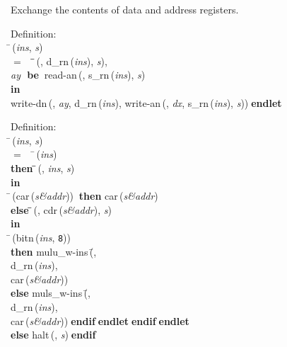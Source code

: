  Exchange the contents of data and address registers.
\begin{tabbing}{\sc Definition}: \\  
\=\,({\it{ins\/}}, {\it{s\/}}) \\ 
$=$$\;\;\;\;$\=\=\,({}, {\rm{d\_rn}}\,({\it{ins\/}}), {\it{s\/}}), \\ 
{\it{ay\/}}{\bf $\;$ be$\;\;$}{\rm{read-an}}\,({}, {\rm{s\_rn}}\,({\it{ins\/}}), {\it{s\/}})\- \\ 
{\bf in} \\ 
{\rm{write-dn}}\,({}, {\it{ay\/}}, {\rm{d\_rn}}\,({\it{ins\/}}), {\rm{write-an}}\,({}, {\it{dx\/}}, {\rm{s\_rn}}\,({\it{ins\/}}), {\it{s\/}}))$\;${\bf  endlet}\-\-
\end{tabbing}

\begin{tabbing}{\sc Definition}: \\  
\=\,({\it{ins\/}}, {\it{s\/}}) \\ 
$=$$\;\;\;\;$\=\,({\it{ins\/}}) \\ 
{\bf then }\=\=\,({}, {\it{ins\/}}, {\it{s\/}})\- \\ 
{\bf in} \\ 
\=\,({\rm{car}}\,({\it{s\&addr\/}}))$\;\;${\bf then }{\rm{car}}\,({\it{s\&addr\/}}) \\ 
{\bf else }\=\=\,({}, {\rm{cdr}}\,({\it{s\&addr\/}}), {\it{s\/}})\- \\ 
{\bf in} \\ 
\=\,({\rm{bitn}}\,({\it{ins\/}}, {\tt{8}})) \\ 
{\bf then }{\rm{mulu\_w-ins}}\,(\=, \\ 
{\rm{d\_rn}}\,({\it{ins\/}}), \\ 
{\rm{car}}\,({\it{s\&addr\/}}))\- \\ 
{\bf else }{\rm{muls\_w-ins}}\,(\=, \\ 
{\rm{d\_rn}}\,({\it{ins\/}}), \\ 
{\rm{car}}\,({\it{s\&addr\/}}))\-$\;${\bf  endif}\-$\;${\bf  endlet}\-$\;${\bf  endif}\-$\;${\bf  endlet}\- \\ 
{\bf else }{\rm{halt}}\,({}, {\it{s\/}})$\;${\bf  endif}\-\-
\end{tabbing}

